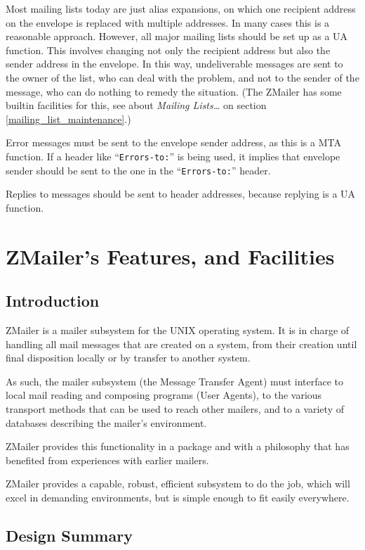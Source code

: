 Most mailing lists today are just alias expansions, on which one recipient 
address on the envelope is replaced with multiple addresses. In many cases 
this is a reasonable approach. However, all major mailing lists should be 
set up as a UA function. This involves changing not only the recipient 
address but also the sender address in the envelope. In this way, 
undeliverable messages are sent to the owner of the list, who can deal 
with the problem, and not to the sender of the message, who can do nothing 
to remedy the situation.
(The ZMailer has some builtin facilities for this, see about
 {\em Mailing Lists\ldots} on section \vref{mailing_list_maintenance}.)

Error messages must be sent to the envelope sender address, as this is a 
MTA function. If a header like ``{\tt Errors-to:}'' is being used, it implies 
that envelope sender should be sent to the one in the ``{\tt Errors-to:}''
header.

Replies to messages should be sent to header addresses, because replying is 
a UA function.


\section{ZMailer's Features, and Facilities}


\subsection{Introduction}

ZMailer is a mailer subsystem for the UNIX operating system.
It is in charge of handling all mail messages that are created
on a system, from their creation until final disposition locally
or by transfer to another system.

As such, the mailer subsystem (the Message Transfer Agent) must
interface to local mail reading and composing programs (User Agents),
to the various transport methods that can be used to reach other mailers,
and to a variety of databases describing the mailer's environment.

ZMailer provides this functionality in a package and with a philosophy
that has benefited from experiences with earlier mailers.

ZMailer provides a capable, robust, efficient subsystem to do the job,
which will excel in demanding environments, but is simple enough to
fit easily everywhere.


\subsection{Design Summary}

